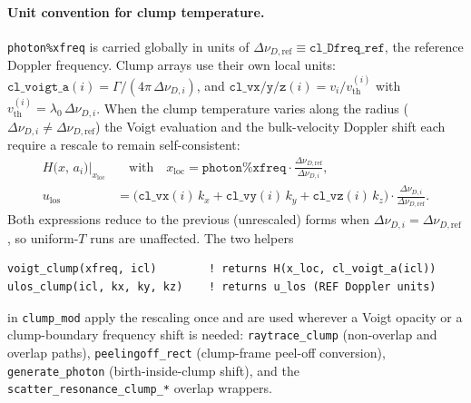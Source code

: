 \documentclass[english,a4paper]{my_memo}
\begin{document}
\paragraph{Unit convention for clump temperature.}
\texttt{photon\%xfreq} is carried globally in units of
$\Delta\nu_{D,\text{ref}}\equiv\texttt{cl\_Dfreq\_ref}$, the reference
Doppler frequency.  Clump arrays use their own local units:
$\texttt{cl\_voigt\_a}(i) = \Gamma/(4\pi\,\Delta\nu_{D,i})$, and
$\texttt{cl\_vx/y/z}(i) = v_i/v_\text{th}^{(i)}$ with
$v_\text{th}^{(i)} = \lambda_0\,\Delta\nu_{D,i}$.  When the clump
temperature varies along the radius
($\Delta\nu_{D,i}\neq\Delta\nu_{D,\text{ref}}$) the Voigt evaluation and
the bulk-velocity Doppler shift each require a rescale to remain
self-consistent:
\begin{align}
  H\!\bigl(x,\,a_i\bigr)\bigr|_{x_\mathrm{loc}}
    &\quad\text{with}\quad
    x_\mathrm{loc} = \texttt{photon\%xfreq}
                     \cdot \frac{\Delta\nu_{D,\text{ref}}}{\Delta\nu_{D,i}},
    \\
  u_\mathrm{los}
    &= \bigl(\texttt{cl\_vx}(i)\,k_x
            + \texttt{cl\_vy}(i)\,k_y
            + \texttt{cl\_vz}(i)\,k_z\bigr)
       \cdot \frac{\Delta\nu_{D,i}}{\Delta\nu_{D,\text{ref}}}.
\end{align}
Both expressions reduce to the previous (unrescaled) forms when
$\Delta\nu_{D,i} = \Delta\nu_{D,\text{ref}}$, so uniform-$T$ runs are
unaffected.  The two helpers
\begin{lstlisting}
voigt_clump(xfreq, icl)        ! returns H(x_loc, cl_voigt_a(icl))
ulos_clump(icl, kx, ky, kz)    ! returns u_los (REF Doppler units)
\end{lstlisting}
in \texttt{clump\_mod} apply the rescaling once and are used wherever a
Voigt opacity or a clump-boundary frequency shift is needed:
\texttt{raytrace\_clump} (non-overlap and overlap paths),
\texttt{peelingoff\_rect} (clump-frame peel-off conversion),
\texttt{generate\_photon} (birth-inside-clump shift), and the
\texttt{scatter\_resonance\_clump\_*} overlap wrappers.
\end{document}
